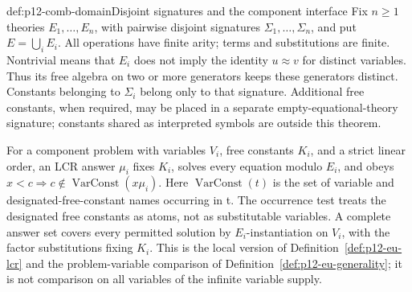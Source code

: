 \begin{hbdefinition}{def:p12-comb-domain}{Disjoint signatures and the component interface}
Fix \(n\geq1\) theories \(E_1,\ldots,E_n\), with pairwise disjoint
signatures \(\Sigma_1,\ldots,\Sigma_n\), and put \(E=\bigcup_i E_i\).
All operations have finite arity; terms and substitutions are finite.
Nontrivial means that \(E_i\) does not imply the identity \(u\approx v\)
for distinct variables. Thus its free algebra on two or more generators
keeps these generators distinct. Constants belonging to \(\Sigma_i\)
belong only to that signature. Additional free constants, when required,
may be placed in a separate empty-equational-theory signature; constants
shared as interpreted symbols are outside this theorem.

For a component problem with variables \(V_i\), free constants \(K_i\),
and a strict linear order, an LCR answer \(\mu_i\) fixes \(K_i\), solves
every equation modulo \(E_i\), and obeys
\(x<c\Rightarrow c\notin\operatorname{VarConst}(x\mu_i)\).
Here \(\operatorname{VarConst}(t)\) is the set of variable and
designated-free-constant names occurring in t. The occurrence test treats
the designated free constants as atoms,
not as substitutable variables. A complete answer set covers every
permitted solution by \(E_i\)-instantiation on \(V_i\), with the
factor substitutions fixing \(K_i\). This is the local version of
Definition~\ref{def:p12-eu-lcr} and the problem-variable comparison of
Definition~\ref{def:p12-eu-generality}; it is not comparison on all
variables of the infinite variable supply.
\end{hbdefinition}

